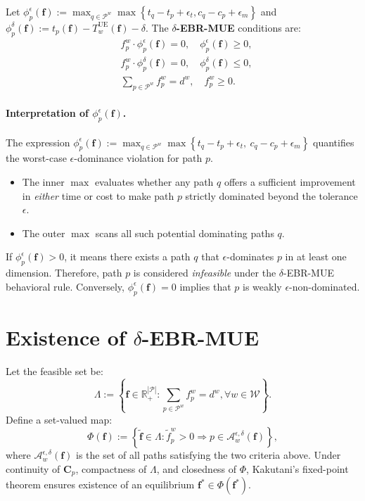 \documentclass[11pt]{article}
\begin{document}
Let $\phi_p^{\epsilon}(\mathbf{f}) := \max_{q \in \mathcal{P}^w} \max\left\{t_q - t_p + \epsilon_t, c_q - c_p + \epsilon_m \right\}$ and $\phi_p^{\delta}(\mathbf{f}) := t_p(\mathbf{f}) - T_w^{\mathrm{UE}}(\mathbf{f}) - \delta$. The \textbf{$\delta$-EBR-MUE} conditions are:
\begin{align*}
    & f_p^w \cdot \phi_p^{\epsilon}(\mathbf{f}) = 0, \quad \phi_p^{\epsilon}(\mathbf{f}) \ge 0, \\
    & f_p^w \cdot \phi_p^{\delta}(\mathbf{f}) = 0, \quad \phi_p^{\delta}(\mathbf{f}) \le 0, \\
    & \sum_{p \in \mathcal{P}^w} f_p^w = d^w, \quad f_p^w \ge 0.
\end{align*}

\paragraph{Interpretation of $\phi_p^\epsilon(\mathbf{f})$.}
The expression $\phi_p^\epsilon(\mathbf{f}) := \max_{q \in \mathcal{P}^w} \max \left\{ t_q - t_p + \epsilon_t,\ c_q - c_p + \epsilon_m \right\}$ quantifies the worst-case $\epsilon$-dominance violation for path $p$.

\begin{itemize}
    \item The inner $\max$ evaluates whether any path $q$ offers a sufficient improvement in \emph{either} time or cost to make path $p$ strictly dominated beyond the tolerance $\epsilon$.
    \item The outer $\max$ scans all such potential dominating paths $q$.
\end{itemize}

If $\phi_p^\epsilon(\mathbf{f}) > 0$, it means there exists a path $q$ that $\epsilon$-dominates $p$ in at least one dimension. Therefore, path $p$ is considered \emph{infeasible} under the $\delta$-EBR-MUE behavioral rule. Conversely, $\phi_p^\epsilon(\mathbf{f}) = 0$ implies that $p$ is weakly $\epsilon$-non-dominated.

\section{Existence of \texorpdfstring{$\delta$}{delta}-EBR-MUE}

Let the feasible set be:
\[
\Lambda := \left\{ \mathbf{f} \in \mathbb{R}_+^{|\mathcal{P}|} : \sum_{p \in \mathcal{P}^w} f_p^w = d^w, \forall w \in \mathcal{W} \right\}.
\]
Define a set-valued map:
\[
\Phi(\mathbf{f}) := \left\{ \tilde{\mathbf{f}} \in \Lambda : \tilde{f}_p^w > 0 \Rightarrow p \in \mathcal{A}_w^{\epsilon,\delta}(\mathbf{f}) \right\},
\]
where $\mathcal{A}_w^{\epsilon,\delta}(\mathbf{f})$ is the set of all paths satisfying the two criteria above. Under continuity of $\mathbf{C}_p$, compactness of $\Lambda$, and closedness of $\Phi$, Kakutani’s fixed-point theorem ensures existence of an equilibrium $\mathbf{f}^* \in \Phi(\mathbf{f}^*)$.
\end{document}
